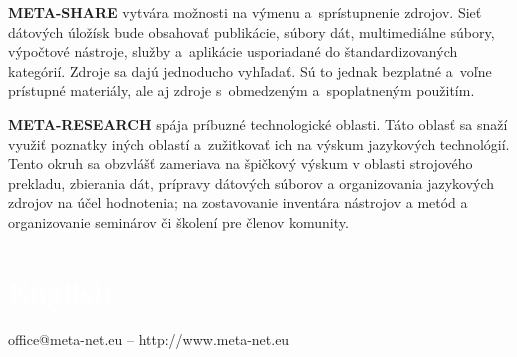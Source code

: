 \begin{multicols}{2}
{\bf META-SHARE} vytvára možnosti na výmenu a~sprístupnenie zdrojov. Sieť dátových úložísk bude obsahovať publikácie, súbory dát, multimediálne súbory, výpočtové nástroje, služby a~aplikácie usporiadané do štandardizovaných kategórií. Zdroje sa dajú jednoducho vyhľadať. Sú to jednak bezplatné a~voľne prístupné materiály, ale aj zdroje s~obmedzeným a~spoplatneným použitím. 

{\bf META-RESEARCH} spája príbuzné technologické oblasti. Táto oblasť sa snaží využiť poznatky iných oblastí a~zužitkovať ich na výskum jazykových technológií. Tento okruh sa obzvlášť zameriava na špičkový výskum v oblasti strojového prekladu, zbierania dát, prípravy dátových súborov a organizovania jazykových zdrojov na účel hodnotenia; na zostavovanie inventára nástrojov a metód a organizovanie seminárov či školení pre členov komunity. 
\end{multicols}

\vfill


\makeatletter
{}
{
  \renewcommand*{\theHsection}{\thepart.\thesection}
}
\makeatother
\part*{\textcolor{white}{English}}
\setcounter{section}{0}
\setcounter{figure}{0}

\centerline{office@meta-net.eu -- http://www.meta-net.eu}


\cleardoublepage


